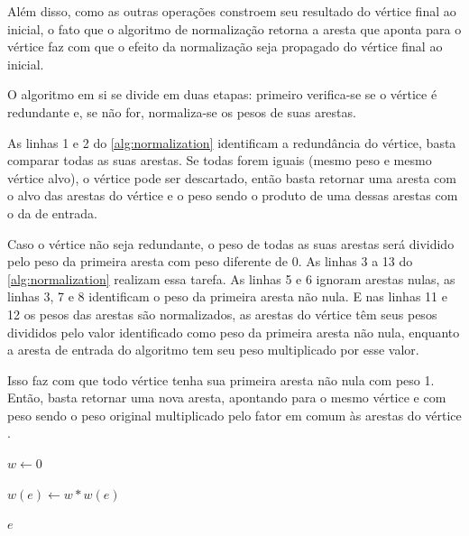 Além disso, como as outras operações constroem seu resultado do vértice final ao inicial, o fato que o algoritmo de normalização retorna a aresta que aponta para o vértice faz com que o efeito da normalização seja propagado do vértice final ao inicial. 

O algoritmo em si se divide em duas etapas: primeiro verifica-se se o vértice é redundante e, se não for, normaliza-se os pesos de suas arestas.

As linhas 1 e 2 do \cref{alg:normalization} identificam a redundância do vértice, basta comparar todas as suas arestas. Se todas forem iguais (mesmo peso e mesmo vértice alvo), o vértice pode ser descartado, então basta retornar uma aresta com o alvo das arestas do vértice e o peso sendo o produto de uma dessas arestas com o da de entrada.

Caso o vértice não seja redundante, o peso de todas as suas arestas será dividido pelo peso da primeira aresta com peso diferente de 0. As linhas 3 a 13 do \cref{alg:normalization} realizam essa tarefa. As linhas 5 e 6 ignoram arestas nulas, as linhas 3, 7 e 8 identificam o peso da primeira aresta não nula. E nas linhas 11 e 12 os pesos das arestas são normalizados, as arestas do vértice têm seus pesos divididos pelo valor identificado como peso da primeira aresta não nula, enquanto a aresta de entrada do algoritmo tem seu peso multiplicado por esse valor.  

Isso faz com que todo vértice tenha sua primeira aresta não nula com peso 1. Então, basta retornar uma nova aresta, apontando para o mesmo vértice e com peso sendo o peso original multiplicado pelo fator em comum às arestas do vértice \cite{miller2006qmdd}.

\begin{algorithm}[H]
  \caption{Normalização de Vértice da Aresta}
  \label{alg:normalization}

  $w \gets 0$ \;

  $w(e) \gets w * w(e) $

  \Return $e$

\end{algorithm}

